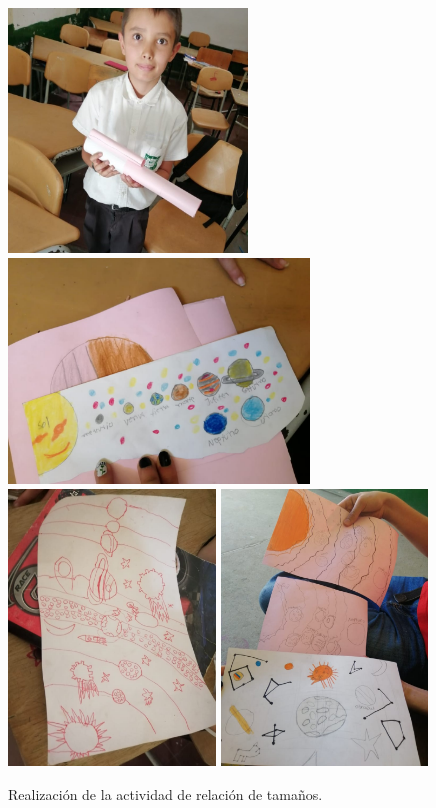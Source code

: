 \documentclass[a4paper,10pt]{article}
\begin{document}
\begin{figure}[H]
    \centering
    \includegraphics[width=6.35cm]{clavellinas/Imagen1.jpg}
    \includegraphics[width=8cm]{clavellinas/act-sistsolar.jpeg}
    \includegraphics[width=5.5cm]{clavellinas/act-sistsolar1.jpeg}
    \includegraphics[width=5.5cm]{clavellinas/act-sistsolar2.jpeg}
    \caption{Realización de la actividad de relación de tamaños.}
\end{figure}
\end{document}

